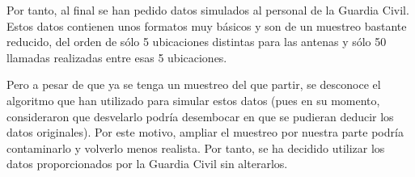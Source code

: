     Por tanto, al final se han pedido datos simulados al personal de la Guardia Civil. Estos datos contienen unos formatos muy básicos y son de un muestreo bastante reducido, del orden de sólo 5 ubicaciones distintas para las antenas y sólo 50 llamadas realizadas entre esas 5 ubicaciones.
    
    Pero a pesar de que ya se tenga un muestreo del que partir, se desconoce el algoritmo que han utilizado para simular estos datos (pues en su momento, consideraron que desvelarlo podría desembocar en que se pudieran deducir los datos originales). Por este motivo, ampliar el muestreo por nuestra parte podría contaminarlo y volverlo menos realista.
    Por tanto, se ha decidido utilizar los datos proporcionados por la Guardia Civil sin alterarlos.
    
    